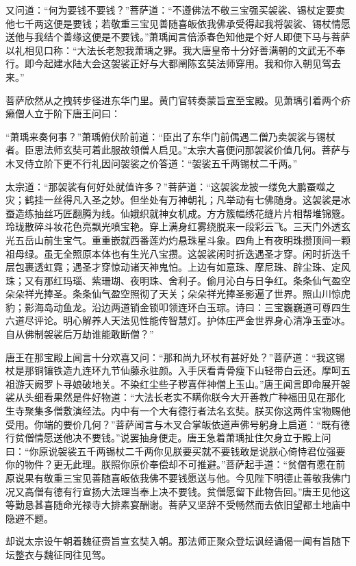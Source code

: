 \documentclass[12pt,UTF8]{ctexbook}
\begin{document}
{又问道：“何为要钱不要钱？”菩萨道：“不遵佛法不敬三宝强买袈裟、锡杖定要卖他七千两这便是要钱；若敬重三宝见善随喜皈依我佛承受得起我将袈裟、锡杖情愿送他与我结个善缘这便是不要钱。”萧瑀闻言倍添春色知他是个好人即便下马与菩萨以礼相见口称：“大法长老恕我萧瑀之罪。我大唐皇帝十分好善满朝的文武无不奉行。即今起建水陆大会这袈裟正好与大都阐陈玄奘法师穿用。我和你入朝见驾去来。”

菩萨欣然从之拽转步径进东华门里。黄门官转奏蒙旨宣至宝殿。见萧瑀引着两个疥癞僧人立于阶下唐王问曰：

“萧瑀来奏何事？”萧瑀俯伏阶前道：“臣出了东华门前偶遇二僧乃卖袈裟与锡杖者。臣思法师玄奘可着此服故领僧人启见。”太宗大喜便问那袈裟价值几何。菩萨与木叉侍立阶下更不行礼因问袈裟之价答道：“袈裟五千两锡杖二千两。”

太宗道：“那袈裟有何好处就值许多？”菩萨道：“这袈裟龙披一缕免大鹏蚕噬之灾；鹤挂一丝得凡入圣之妙。但坐处有万神朝礼；凡举动有七佛随身。这袈裟是冰蚕造练抽丝巧匠翻腾为线。仙娥织就神女机成。方方簇幅绣花缝片片相帮堆锦簆。玲珑散碎斗妆花色亮飘光喷宝艳。穿上满身红雾绕脱来一段彩云飞。三天门外透玄光五岳山前生宝气。重重嵌就西番莲灼灼悬珠星斗象。四角上有夜明珠攒顶间一颗祖母绿。虽无全照原本体也有生光八宝攒。这袈裟闲时折迭遇圣才穿。闲时折迭千层包裹透虹霓；遇圣才穿惊动诸天神鬼怕。上边有如意珠、摩尼珠、辟尘珠、定风珠；又有那红玛瑙、紫珊瑚、夜明珠、舍利子。偷月沁白与日争红。条条仙气盈空朵朵祥光捧圣。条条仙气盈空照彻了天关；朵朵祥光捧圣影遍了世界。照山川惊虎豹；影海岛动鱼龙。沿边两道销金锁叩领连环白玉琮。诗曰：三宝巍巍道可尊四生六道尽评论。明心解养人天法见性能传智慧灯。护体庄严金世界身心清净玉壶冰。自从佛制袈裟后万劫谁能敢断僧？”

唐王在那宝殿上闻言十分欢喜又问：“那和尚九环杖有甚好处？”菩萨道：“我这锡杖是那铜镶铁造九连环九节仙藤永驻颜。入手厌看青骨瘦下山轻带白云还。摩呵五祖游天阙罗卜寻娘破地关。不染红尘些子秽喜伴神僧上玉山。”唐王闻言即命展开袈裟从头细看果然是件好物道：“大法长老实不瞒你朕今大开善教广种福田见在那化生寺聚集多僧敷演经法。内中有一个大有德行者法名玄奘。朕买你这两件宝物赐他受用。你端的要价几何？”菩萨闻言与木叉合掌皈依道声佛号躬身上启道：“既有德行贫僧情愿送他决不要钱。”说罢抽身便走。唐王急着萧瑀扯住欠身立于殿上问曰：“你原说袈裟五千两锡杖二千两你见朕要买就不要钱敢是说朕心倚恃君位强要你的物件？更无此理。朕照你原价奉偿却不可推避。”菩萨起手道：“贫僧有愿在前原说果有敬重三宝见善随喜皈依我佛不要钱愿送与他。今见陛下明德止善敬我佛门况又高僧有德有行宣扬大法理当奉上决不要钱。贫僧愿留下此物告回。”唐王见他这等勤恳甚喜随命光禄寺大排素宴酬谢。菩萨又坚辞不受畅然而去依旧望都土地庙中隐避不题。

却说太宗设午朝着魏征赍旨宣玄奘入朝。那法师正聚众登坛讽经诵偈一闻有旨随下坛整衣与魏征同往见驾。

}
\end{document}
